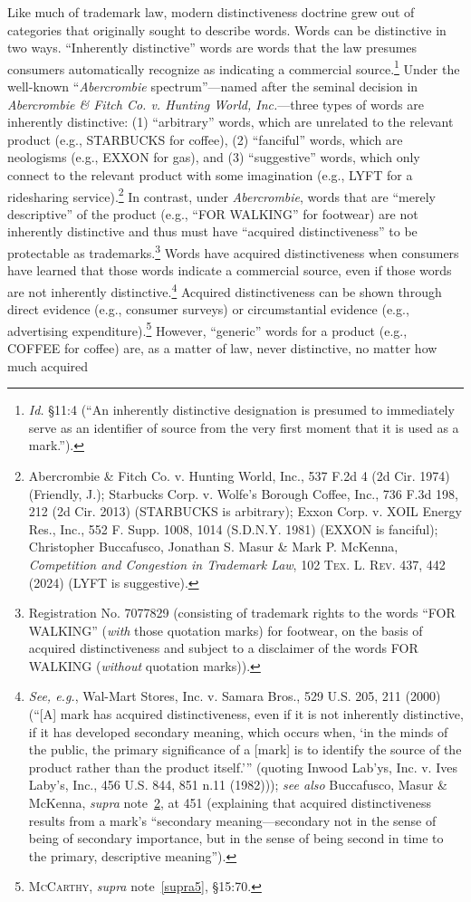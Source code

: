 \documentclass[letterpaper, 11pt, oneside]{article}
\begin{document}
Like much of trademark law, modern distinctiveness doctrine grew out of categories that originally sought to describe words. Words can be distinctive in two ways. ``Inherently distinctive'' words are words that the law presumes consumers automatically recognize as indicating a commercial source.\footnote{\textit{Id.} \S 11:4 (``An inherently distinctive designation is presumed to immediately serve as an identifier of source from the very first moment that it is used as a mark.'').} Under the well-known ``\textit{Abercrombie} spectrum''—named after the seminal decision in \textit{Abercrombie \& Fitch Co. v. Hunting World, Inc.}—three types of words are inherently distinctive: (1) ``arbitrary'' words, which are unrelated to the relevant product (e.g., STARBUCKS for coffee), (2) “fanciful” words, which are neologisms (e.g., EXXON for gas), and (3) ``suggestive'' words, which only connect to the relevant product with some imagination (e.g., LYFT for a ridesharing service).\footnote{\label{supra11} Abercrombie \& Fitch Co. v. Hunting World, Inc., 537 F.2d 4 (2d Cir. 1974) (Friendly, J.); Starbucks Corp. v. Wolfe's Borough Coffee, Inc., 736 F.3d 198, 212 (2d Cir. 2013) (STARBUCKS is arbitrary); Exxon Corp. v. XOIL Energy Res., Inc., 552 F. Supp. 1008, 1014 (S.D.N.Y. 1981) (EXXON is fanciful); Christopher Buccafusco, Jonathan S. Masur \& Mark P. McKenna, \textit{Competition and Congestion in Trademark Law}, 102 \textsc{Tex. L. Rev.} 437, 442 (2024) (LYFT is suggestive).} In contrast, under \textit{Abercrombie}, words that are ``merely descriptive'' of the product (e.g., ``FOR WALKING'' for footwear) are not inherently distinctive and thus must have ``acquired distinctiveness'' to be protectable as trademarks.\footnote{Registration No. 7077829 (consisting of trademark rights to the words ``FOR WALKING'' (\textit{with} those quotation marks) for footwear, on the basis of acquired distinctiveness and subject to a disclaimer of the words FOR WALKING (\textit{without} quotation marks)).} Words have acquired distinctiveness when consumers have learned that those words indicate a commercial source, even if those words are not inherently distinctive.\footnote{\textit{See, e.g.}, Wal-Mart Stores, Inc. v. Samara Bros., 529 U.S. 205, 211 (2000) (``[A] mark has acquired distinctiveness, even if it is not inherently distinctive, if it has developed secondary meaning, which occurs when, `in the minds of the public, the primary significance of a [mark] is to identify the source of the product rather than the product itself.'\thinspace'' (quoting Inwood Lab'ys, Inc. v. Ives Laby's, Inc., 456 U.S. 844, 851 n.11 (1982))); \textit{see also} Buccafusco, Masur \& McKenna, \textit{supra} note~\ref{supra11}, at 451 (explaining that acquired distinctiveness results from a mark's ``secondary meaning—secondary not in the sense of being of secondary importance, but in the sense of being second in time to the primary, descriptive meaning'').} Acquired distinctiveness can be shown through direct evidence (e.g., consumer surveys) or circumstantial evidence (e.g., advertising expenditure).\footnote{\textsc{McCarthy}, \textit{supra} note~\ref{supra5}, \S 15:70.} However, ``generic'' words for a product (e.g., COFFEE for coffee) are, as a matter of law, never distinctive, no matter how much acquired 
\end{document}
